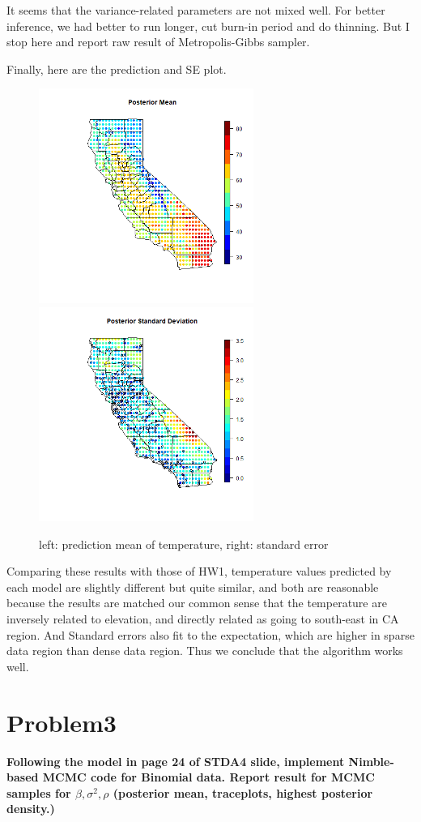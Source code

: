 \documentclass{article}
\begin{document}
It seems that the variance-related parameters are not mixed well. 
For better inference, we had better to run longer, cut burn-in period and do thinning.
But I stop here and report raw result of Metropolis-Gibbs sampler.

\clearpage
Finally, here are the prediction and SE plot.


\begin{figure}[!h]
    \centering
    \includegraphics[height=7cm]{prob2_posterior.png}
    \includegraphics[height=7cm]{prob2_posterior_SE.png}
    \caption{left: prediction mean of temperature, right: standard error}
\end{figure}

Comparing these results with those of HW1, temperature values predicted by each model
are slightly different but quite similar, and both are reasonable because the results are matched 
our common sense that the temperature are inversely related to elevation, 
and directly related as going to south-east in CA region.
And Standard errors also fit to the expectation, which are higher in sparse data region than
dense data region.
Thus we conclude that the algorithm works well.


\section{Problem3}
\textbf{
Following the model in page 24 of STDA4 slide, 
implement Nimble-based MCMC code for Binomial data.
Report result for MCMC samples for $\beta,\sigma^2,\rho$ (posterior mean, traceplots, highest posterior density.)
}
\end{document}
